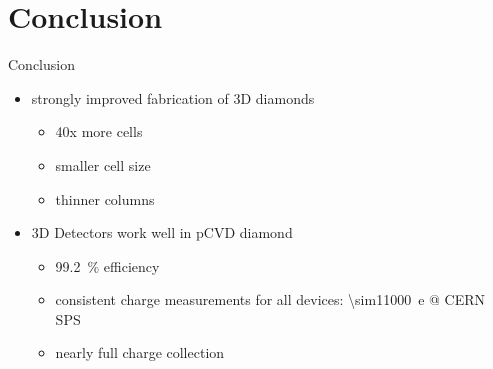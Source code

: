 \section{Conclusion}
\begin{frame}{Conclusion}

	\begin{minipage}[c][5cm]{\textwidth}
		\begin{itemize}\itemfill
			\item strongly improved fabrication of 3D diamonds
			\begin{itemize}
				\item 40x more cells
				\item smaller cell size
				\item thinner columns\vspace*{4ex}
			\end{itemize}
			\item 3D Detectors work well in pCVD diamond
			\begin{itemize}
				\item \SI{99.2}{\%} efficiency
				\item consistent charge measurements for all devices: \SI{\sim11000}{e} @ CERN SPS
				\item nearly full charge collection
			\end{itemize}
		\end{itemize}
	\end{minipage}
	
\end{frame}
